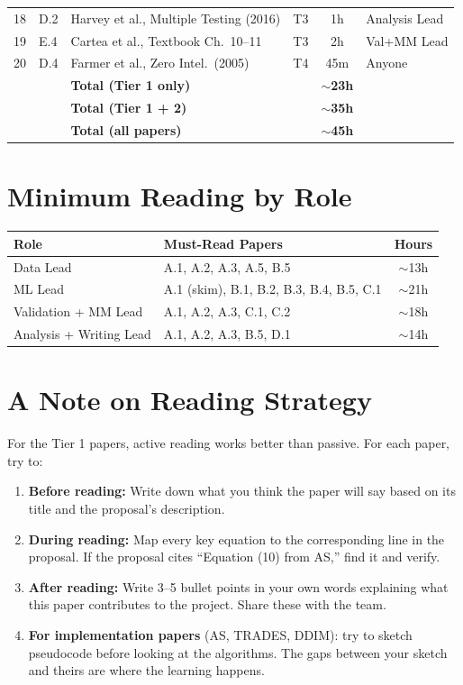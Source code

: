 \documentclass[11pt,a4paper]{article}
\begin{document}
\begin{center}
\begin{longtable}{cllccl}
18 & D.2 & Harvey et al., Multiple Testing (2016) & \textcolor{tier3}{T3} & 1h & Analysis Lead \\
19 & E.4 & Cartea et al., Textbook Ch.\ 10--11 & \textcolor{tier3}{T3} & 2h & Val+MM Lead \\
20 & D.4 & Farmer et al., Zero Intel.\ (2005) & \textcolor{tier4}{T4} & 45m & Anyone \\
\midrule
 & & \textbf{Total (Tier 1 only)} & & \textbf{$\sim$23h} & \\
 & & \textbf{Total (Tier 1 + 2)} & & \textbf{$\sim$35h} & \\
 & & \textbf{Total (all papers)} & & \textbf{$\sim$45h} & \\
\bottomrule
\end{longtable}
\end{center}

\section*{Minimum Reading by Role}

\begin{center}
\begin{tabularx}{\textwidth}{lXc}
\toprule
\textbf{Role} & \textbf{Must-Read Papers} & \textbf{Hours} \\
\midrule
Data Lead & A.1, A.2, A.3, A.5, B.5 & $\sim$13h \\
ML Lead & A.1 (skim), B.1, B.2, B.3, B.4, B.5, C.1 & $\sim$21h \\
Validation + MM Lead & A.1, A.2, A.3, C.1, C.2 & $\sim$18h \\
Analysis + Writing Lead & A.1, A.2, A.3, B.5, D.1 & $\sim$14h \\
\bottomrule
\end{tabularx}
\end{center}

\section*{A Note on Reading Strategy}

For the Tier 1 papers, active reading works better than passive. For each paper, try to:

\begin{enumerate}[nosep]
  \item \textbf{Before reading:} Write down what you think the paper will say based on its title and the proposal's description.
  \item \textbf{During reading:} Map every key equation to the corresponding line in the proposal.  If the proposal cites ``Equation (10) from AS,'' find it and verify.
  \item \textbf{After reading:} Write 3--5 bullet points in your own words explaining what this paper contributes to the project.  Share these with the team.
  \item \textbf{For implementation papers} (AS, TRADES, DDIM): try to sketch pseudocode before looking at the algorithms.  The gaps between your sketch and theirs are where the learning happens.
\end{enumerate}
\end{document}
